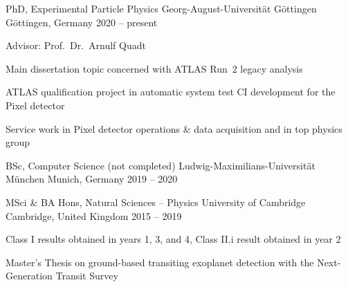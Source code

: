

\begin{cventries}

  \cventry
    {PhD, Experimental Particle Physics} %
    {Georg-August-Universit\"at G\"ottingen} %
    {G\"ottingen, Germany} %
    {2020 -- present} %
    {%
      \begin{cvitems} %
        \item {Advisor: Prof.\ Dr.\ Arnulf Quadt}
        \item {Main dissertation topic concerned with ATLAS Run~2 \ttHbb legacy analysis}
        \item {ATLAS qualification project in automatic system test CI development for the Pixel detector}
        \item {Service work in Pixel detector operations \& data acquisition and in top physics group}
      \end{cvitems}
    }

  \cventry
    {BSc, Computer Science (not completed)} %
    {Ludwig-Maximilians-Universit\"at M\"unchen} %
    {Munich, Germany} %
    {2019 -- 2020} %
    {%
    }

  \cventry
    {MSci \& BA Hons, Natural Sciences -- Physics} %
    {University of Cambridge} %
    {Cambridge, United Kingdom} %
    {2015 -- 2019} %
    {%
      \begin{cvitems} %
        \item {Class I results obtained in years 1, 3, and 4, Class II.i result obtained in year 2}
        \item {
          Master's Thesis on ground-based transiting exoplanet detection with the Next-Generation Transit Survey
        }
      \end{cvitems}
    }

\end{cventries}

